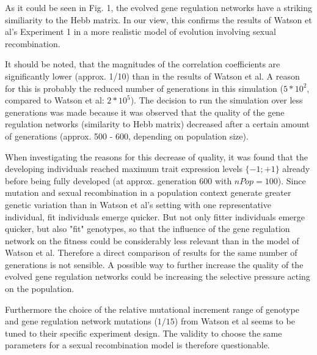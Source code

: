 \documentclass{article}
\begin{document}
As it could be seen in Fig. 1, the evolved gene regulation networks have a striking similiarity to the Hebb matrix. In our view, this confirms the results of Watson et al's Experiment 1 in a more realistic model of evolution involving sexual recombination.

It should be noted, that the magnitudes of the correlation coefficients are significantly lower (approx. 1/10) than in the results of Watson et al.
A reason for this is probably the reduced number of generations in this simulation ($5*10^2$, compared to Watson et al: $2*10^5$).
The decision to run the simulation over less generations was made because it was observed that the quality of the gene regulation networks (similarity to Hebb matrix) decreased after a certain amount of generations (approx. 500 - 600, depending on population size).

When investigating the reasons for this decrease of quality, it was found that the developing individuals reached maximum trait expression levels $\{-1; +1\}$ already before being fully developed (at approx. generation 600 with $nPop = 100$).
Since mutation and sexual recombination in a population context generate greater genetic variation than in Watson et al's setting with one representative individual, fit individuals emerge quicker.
But not only fitter individuals emerge quicker, but also "fit" genotypes, so that the influence of the gene regulation network on the fitness could be considerably less relevant than in the model of Watson et al.
Therefore a direct comparison of results for the same number of generations is not sensible.
A possible way to further increase the quality of the evolved gene regulation networks could be increasing the selective pressure acting on the population.
\newline

Furthermore the choice of the relative mutational increment range of genotype and gene regulation network mutations ($1/15$) from Watson et al seems to be tuned to their specific experiment design. The validity to choose the same parameters for a sexual recombination model is therefore questionable.

\begin{appendix}
   
  
\end{appendix}
\end{document}
